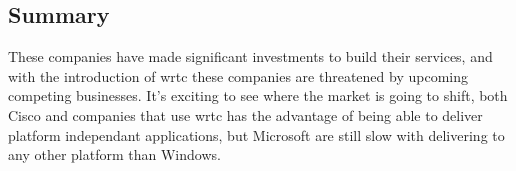 \subsection*{Summary}
These companies have made significant investments to build their services, and with the introduction of \gls{wrtc} these companies are threatened by upcoming competing businesses. It's exciting to see where the market is going to shift, both Cisco and companies that use \gls{wrtc} has the advantage of being able to deliver platform independant applications, but Microsoft are still slow with delivering to any other platform than Windows.